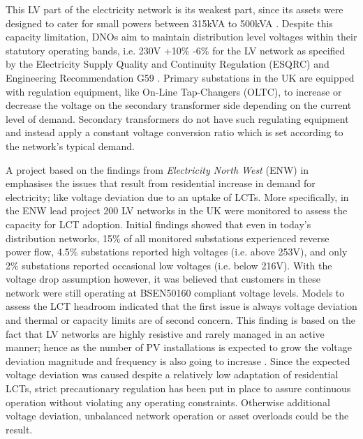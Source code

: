 This LV part of the electricity network is its weakest part, since its assets were designed to cater for small powers between 315kVA to 500kVA \cite{EDS08-0115}.
Despite this capacity limitation, DNOs aim to maintain distribution level voltages within their statutory operating bands, i.e. 230V +10\% -6\% for the LV network as specified by the Electricity Supply Quality and Continuity Regulation (ESQRC) \cite{HealthandSafetyExecutive2002} and Engineering Recommendation G59 \cite{EnergyNetworksAssociation2013}.
Primary substations in the UK are equipped with regulation equipment, like On-Line Tap-Changers (OLTC), to increase or decrease the voltage on the secondary transformer side depending on the current level of demand.
Secondary transformers do not have such regulating equipment and instead apply a constant voltage conversion ratio which is set according to the network's typical demand.

A project based on the findings from \textit{Electricity North West} (ENW) in \cite{ElectricityNorthWestLtd2014} emphasises the issues that result from residential increase in demand for electricity; like voltage deviation due to an uptake of LCTs.
More specifically, in the ENW lead project 200 LV networks in the UK were monitored to assess the capacity for LCT adoption.
Initial findings showed that even in today's distribution networks, 15\% of all monitored substations experienced reverse power flow, 4.5\% substations reported high voltages (i.e. above 253V), and only 2\% substations reported occasional low voltages (i.e. below 216V).
With the voltage drop assumption however, it was believed that customers in these network were still operating at BSEN50160 compliant voltage levels.
Models to assess the LCT headroom indicated that the first issue is always voltage deviation and thermal or capacity limits are of second concern.
This finding is based on the fact that LV networks are highly resistive and rarely managed in an active manner; hence as the number of PV installations is expected to grow the voltage deviation magnitude and frequency is also going to increase \cite{Woyte2006}.
Since the expected voltage deviation was caused despite a relatively low adaptation of residential LCTs, strict precautionary regulation has been put in place to assure continuous operation without violating any operating constraints.
Otherwise additional voltage deviation, unbalanced network operation or asset overloads could be the result.

